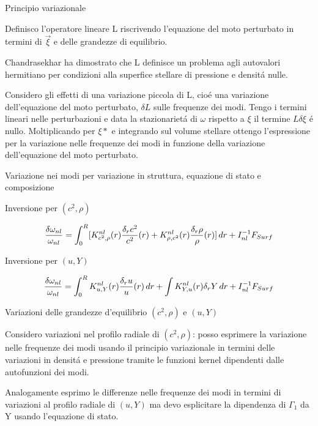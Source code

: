 \documentclass[10pt,xcolor={usenames},fleqn,mathserif,serif]{beamer}
\begin{document}
\begin{wordonframe}{Principio variazionale}

Definisco l'operatore lineare L riscrivendo l'equazione del moto perturbato in termini di $\vec{\xi}$ e delle grandezze di equilibrio. 

Chandrasekhar ha dimostrato che L definisce un problema agli autovalori hermitiano per condizioni alla superfice stellare di pressione e densit\'a nulle.

Considero gli effetti di una variazione piccola di L, cio\'e una variazione dell'equazione del moto perturbato, $\delta L$ sulle frequenze dei modi. Tengo i termini lineari nelle perturbazioni e data la stazionariet\'a di $\omega$ rispetto a $\xi$ il termine $L\delta \xi$ \'e nullo. Moltiplicando per $\xi*$  e integrando sul volume stellare ottengo l'espressione per la variazione nelle frequenze dei modi in funzione della variazione dell'equazione del moto perturbato.

\end{wordonframe}

\begin{frame}{Variazione nei modi per variazione in struttura, equazione di stato e composizione}

\begin{block}{Inversione per $(c^2,\rho)$}

\begin{equation*}
\frac{\delta\omega_{nl}}{\omega_{nl}}=\int_0^R[K^{nl}_{c^2,\rho}(r)\frac{\delta_rc^2}{c^2}(r)+K^{nl}_{\rho,c^2}(r)\frac{\delta_r\rho}{\rho}(r)]\,dr+I_{nl}^{-1}F_{Surf}
\end{equation*}

\end{block}

\begin{block}{Inversione per $(u,Y)$}

\begin{equation*}
\frac{\delta\omega_{nl}}{\omega_{nl}}=\int_0^RK^{nl}_{u,Y}(r)\frac{\delta_ru}{u}(r)\,dr+\int K^{nl}_{Y,u}(r)\delta_rY\,dr+I_{nl}^{-1}F_{Surf}
\end{equation*}

\end{block}

\end{frame}

\begin{wordonframe}{Variazioni delle grandezze d'equilibrio $(c^2,\rho)$ e $(u,Y)$}

Considero variazioni nel profilo radiale di $(c^2,\rho)$: posso esprimere la variazione nelle frequenze dei modi usando il principio variazionale in termini delle variazioni in densit\'a e pressione tramite le funzioni kernel dipendenti dalle autofunzioni dei modi.

Analogamente  esprimo le differenze nelle frequenze dei modi in termini di variazioni al profilo radiale di $(u,Y)$ ma devo esplicitare la dipendenza di $\Gamma_1$ da Y usando l'equazione di stato.

\end{wordonframe}
\end{document}
